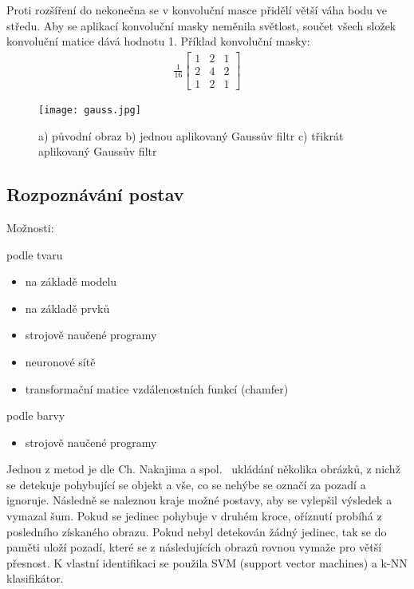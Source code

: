Proti rozšíření do nekonečna se v konvoluční masce přidělí větší váha bodu ve středu. Aby se aplikací konvoluční masky neměnila světlost, součet všech složek konvoluční matice dává hodnotu 1. Příklad konvoluční masky:
\begin{eqnarray}
\frac{1}{16} \begin{bmatrix}
1 & 2 & 1 \\
2 & 4 & 2 \\
1 & 2 & 1
\end{bmatrix}
\end{eqnarray} 

\begin{figure}[h]
\centering
\texttt{[image: gauss.jpg]}
\caption{a) původní obraz b) jednou aplikovaný Gaussův filtr c) třikrát aplikovaný Gaussův filtr~\cite{15} }
\end{figure}





\subsection{Rozpoznávání postav}
Možnosti:

podle tvaru
\begin{itemize}
\item na základě modelu
\item na základě prvků

\item strojově naučené programy
\item neuronové sítě %
\item transformační matice vzdálenostních funkcí (chamfer)
\end{itemize}

podle barvy
\begin{itemize}
\item strojově naučené programy\\
\end{itemize}


Jednou z metod je dle Ch. Nakajima a spol.~\cite{6} ukládání několika obrázků, z nichž se detekuje pohybující se objekt a vše, co se nehýbe se označí za pozadí a ignoruje. Následně se naleznou kraje možné postavy, aby se vylepšil výsledek a vymazal šum. Pokud se jedinec pohybuje v druhém kroce, oříznutí probíhá z posledního získaného obrazu. Pokud nebyl detekován žádný jedinec, tak se do paměti uloží pozadí, které se z následujících obrazů rovnou vymaže pro větší přesnost. K vlastní identifikaci se použila SVM (support vector machines) a k-NN klasifikátor.\\

